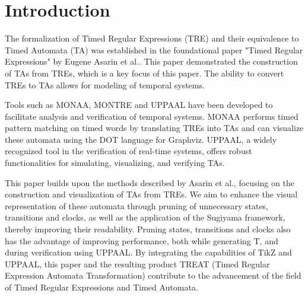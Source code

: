 \section{Introduction}
The formalization of Timed Regular Expressions (TRE) and their equivalence to Timed Automata (TA) was established in the foundational paper "Timed Regular Expressions" by Eugene Asarin et al.\cite{Eugene2001}.
This paper demonstrated the construction of TAs from TREs, which is a key focus of this paper.
The ability to convert TREs to TAs allows for modeling of temporal systems.

Tools such as MONAA, MONTRE and UPPAAL have been developed to facilitate analysis and verification of temporal systems.
MONAA performs timed pattern matching on timed words by translating TREs into TAs and can visualize these automata using the DOT language for Graphviz.
UPPAAL, a widely recognized tool in the verification of real-time systems, offers robust functionalities for simulating, visualizing, and verifying TAs.

This paper builds upon the methods described by Asarin et al., focusing on the construction and visualization of TAs from TREs.
We aim to enhance the visual representation of these automata through pruning of unnecessary states, transitions and clocks, as well as the application of the Sugiyama framework, thereby improving their readability.
Pruning states, transitions and clocks also has the advantage of improving performance, both while generating T, and during verification using UPPAAL.
By integrating the capabilities of TikZ and UPPAAL, this paper and the resulting product TREAT (Timed Regular Expression Automata Transformation) contribute to the advancement of the field of Timed Regular Expressions and Timed Automata.